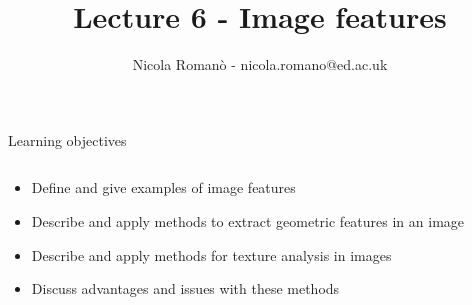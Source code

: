 \documentclass[9pt, aspectratio=169]{beamer}
\author{Nicola Roman\`o - nicola.romano@ed.ac.uk}
\title{Lecture 6 - Image features}
\date{}
\begin{document}

\begin{frame}
    \titlepage
\end{frame}

\begin{frame}
    {Learning objectives}
    \begin{columns}
        \begin{column}{0.8\textwidth}
            \begin{itemize}
                \item Define and give examples of image features
                \item Describe and apply methods to extract geometric features in an image
                \item Describe and apply methods for texture analysis in images
                \item Discuss advantages and issues with these methods
            \end{itemize}
        \end{column}
        \begin{column}{0.2\textwidth}

\end{column}
\end{columns}
\end{frame}
\end{document}
